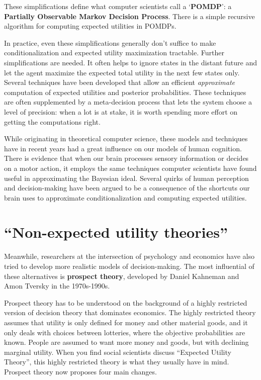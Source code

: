 These simplifications define what computer scientists call a `\textbf{POMDP}': a
\textbf{Partially Observable Markov Decision Process}. There is a simple
recursive algorithm for computing expected utilities in POMDPs.


In practice, even these simplifications generally don't suffice to make
conditionalization and expected utility maximization tractable. Further
simplifications are needed. It often helps to ignore states in the distant
future and let the agent maximize the expected total utility in the next few
states only. Several techniques have been developed that allow an efficient
\emph{approximate} computation of expected utilities and posterior
probabilities. These techniques are often supplemented by a meta-decision
process that lets the system choose a level of precision: when a lot is at
stake, it is worth spending more effort on getting the computations right.

While originating in theoretical computer science, these models and techniques
have in recent years had a great influence on our models of human cognition.
There is evidence that when our brain processes sensory information or decides
on a motor action, it employs the same techniques computer scientists have found
useful in approximating the Bayesian ideal. Several quirks of human perception
and decision-making have been argued to be a consequence of the shortcuts our
brain uses to approximate conditionalization and computing expected utilities.


\section{``Non-expected utility theories''}\label{sec:prospect-theory}

Meanwhile, researchers at the intersection of psychology and economics have also
tried to develop more realistic models of decision-making. The most influential
of these alternatives is \textbf{prospect theory}, developed by Daniel Kahneman
and Amon Tversky in the 1970s-1990s.

Prospect theory has to be understood on the background of a highly restricted
version of decision theory that dominates economics. The highly restricted
theory assumes that utility is only defined for money and other material goods,
and it only deals with choices between lotteries, where the objective
probabilities are known. People are assumed to want more money and goods, but
with declining marginal utility. When you find social scientists discuss
``Expected Utility Theory'', this highly restricted theory is what they usually
have in mind. Prospect theory now proposes four main changes.

